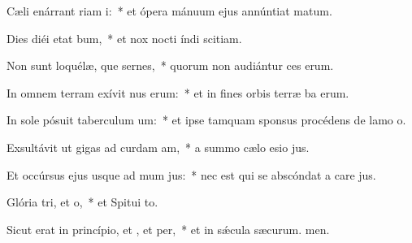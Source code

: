 \item Cæli enárrant riam i:~* et ópera mánuum ejus annúntiat matum.
\item Dies diéi etat bum,~* et nox nocti índi scitiam.
\item Non sunt loquélæ, que sernes,~* quorum non audiántur ces erum.
\item In omnem terram exívit nus erum:~* et in fines orbis terræ ba erum.
\item In sole pósuit taberculum um:~* et ipse tamquam sponsus procédens de lamo o.
\item Exsultávit ut gigas ad curdam am,~* a summo cælo esio jus.
\item Et occúrsus ejus usque ad mum jus:~* nec est qui se abscóndat a care jus.
\item Glória tri, et o,~* et Spitui to.
\item Sicut erat in princípio, et , et per,~* et in sǽcula sæcurum. men.
